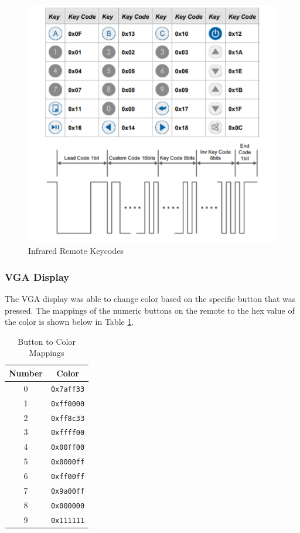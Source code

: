 \documentclass{article}
\begin{document}
        \begin{figure}[H]
            \centering
            \includegraphics[scale=0.8]{keycodes.png}
            \caption{Infrared Remote Keycodes}
            \label{fig:keycodes}
        \end{figure}
    
    \subsubsection{VGA Display}
    The VGA display was able to change color based on the specific button that was pressed. The mappings of the numeric buttons on the remote to the hex value of the color is shown below in Table \ref{tbl:color}.
    
    \begin{table}[H]
        \centering
        \begin{tabular}{|c|c|} \hline
            \textbf{Number} & \textbf{Color} \\\hline
            0 & {\tt 0x7aff33} \\\hline
            1 & {\tt 0xff0000} \\\hline
            2 & {\tt 0xff8c33} \\\hline
            3 & {\tt 0xffff00} \\\hline
            4 & {\tt 0x00ff00} \\\hline
            5 & {\tt 0x0000ff} \\\hline
            6 & {\tt 0xff00ff} \\\hline
            7 & {\tt 0x9a00ff} \\\hline
            8 & {\tt 0x000000} \\\hline
            9 & {\tt 0x111111} \\\hline
        \end{tabular}
        \caption{Button to Color Mappings}
        \label{tbl:color}
    \end{table}
    
\end{document}
